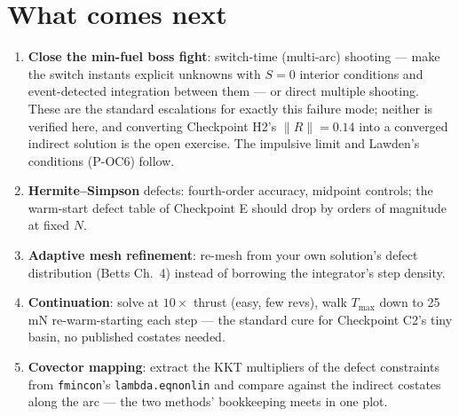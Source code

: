 \documentclass[11pt,letterpaper]{article}
\begin{document}
\section{What comes next}

\begin{enumerate}[leftmargin=1.6em]
\item \textbf{Close the min-fuel boss fight}: switch-time (multi-arc)
      shooting --- make the switch instants explicit unknowns with $S=0$
      interior conditions and event-detected integration between them ---
      or direct multiple shooting. These are the standard escalations
      for exactly this failure mode; neither is verified here, and
      converting Checkpoint H2's $\|R\| = 0.14$ into a converged
      indirect solution is the open exercise. The impulsive
      limit and Lawden's conditions (P-OC6) follow.
\item \textbf{Hermite--Simpson} defects: fourth-order accuracy, midpoint
      controls; the warm-start defect table of Checkpoint E should drop
      by orders of magnitude at fixed $N$.
\item \textbf{Adaptive mesh refinement}: re-mesh from your own solution's
      defect distribution (Betts Ch.~4) instead of borrowing the
      integrator's step density.
\item \textbf{Continuation}: solve at $10\times$ thrust (easy, few revs),
      walk $T_{\max}$ down to 25\,mN re-warm-starting each step --- the
      standard cure for Checkpoint C2's tiny basin, no published costates
      needed.
\item \textbf{Covector mapping}: extract the KKT multipliers of the defect
      constraints from \texttt{fmincon}'s \texttt{lambda.eqnonlin} and
      compare against the indirect costates along the arc --- the two
      methods' bookkeeping meets in one plot.
\end{enumerate}
\end{document}

